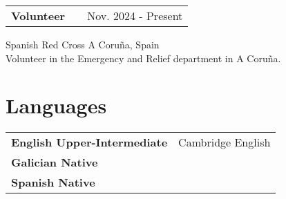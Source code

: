 \documentclass[a4paper,12pt]{article}
\makeatletter
\newenvironment{jobshort}[2]
    {
    \begin{tabularx}{\linewidth}{@{}l X r@{}}
    \textbf{#1} & \hfill &  #2 \\[3.75pt]
    \end{tabularx}
    }
    {
    }
\makeatother
\begin{document}
\begin{jobshort}{Volunteer}{Nov. 2024 - Present}
Spanish Red Cross \hfill A Coruña, Spain \\[3.75pt]
Volunteer in the Emergency and Relief department in A Coruña.
\end{jobshort}

\section{Languages}
\begin{tabularx}{\linewidth}{@{}l X@{}}
\textbf{English Upper-Intermediate} & \hfill Cambridge English \\
\textbf{Galician Native} \\
\textbf{Spanish Native}
\end{tabularx}



\vfill
{}
\end{document}
